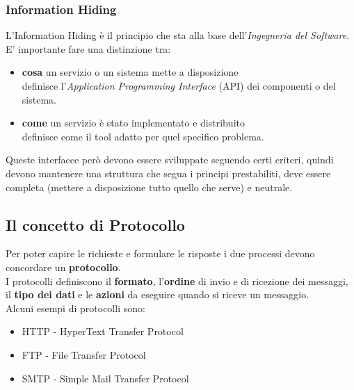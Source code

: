 \documentclass[12pt, a4paper]{article}
\begin{document}
    \subsubsection{Information Hiding}
    L'Information Hiding è il principio che sta alla base dell'\textit{Ingegneria del Software}.
    \\E' importante fare una distinzione tra:
    \begin{itemize}
        \item \textbf{cosa} un servizio o un sistema mette a disposizione
        \\definisce l'\textit{Application Programming Interface} (API) dei componenti o del sistema.
        \item \textbf{come} un servizio è stato implementato e distribuito
        \\definisce come il tool adatto per quel specifico problema.
    \end{itemize}
    
    Queste interfacce però devono essere sviluppate seguendo certi criteri, 
    quindi devono mantenere una struttura che segua i principi prestabiliti,
    deve essere completa (mettere a disposizione tutto quello che serve) e neutrale.

    \subsection{Il concetto di Protocollo}
    Per poter capire le richieste e formulare le risposte i due processi devono concordare
    un \textbf{protocollo}.
    \\I protocolli definiscono il \textbf{formato}, l'\textbf{ordine} di invio e di ricezione dei messaggi,
    il \textbf{tipo dei dati} e le \textbf{azioni} da eseguire quando si riceve un messaggio.
    \\Alcuni esempi di protocolli sono:
    \begin{itemize}
        \item HTTP - HyperText Transfer Protocol
        \item FTP - File Transfer Protocol
        \item SMTP - Simple Mail Transfer Protocol
    \end{itemize}
    
    
     
    


    
\end{document}
